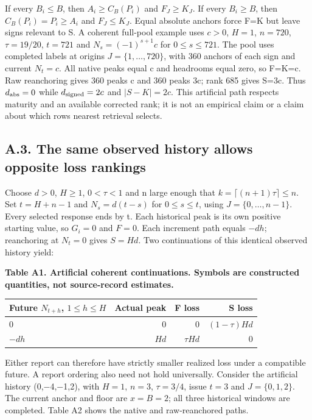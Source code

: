 \documentclass[10pt,a4paper]{article}
\begin{document}
If every \(B_i\le B\), then \(A_i\ge C_B(P_i)\) and \(F_J\ge K_J\). If every \(B_i\ge B\), then \(C_B(P_i)=P_i\ge A_i\) and \(F_J\le K_J\). Equal absolute anchors force F=K but leave signs relevant to S. A coherent full-pool example uses \(c>0\), \(H=1\), \(n=720\), \(\tau=19/20\), \(t=721\) and \(N_s=(-1)^{s+1}c\) for \(0\le s\le721\). The pool uses completed labels at origins \(J=\{1,\ldots,720\}\), with 360 anchors of each sign and current \(N_t=c\). All native peaks equal c and headrooms equal zero, so F=K=c. Raw reanchoring gives 360 peaks c and 360 peaks 3c; rank 685 gives S=3c. Thus \(d_{\rm abs}=0\) while \(d_{\rm signed}=2c\) and \(|S-K|=2c\). This artificial path respects maturity and an available corrected rank; it is not an empirical claim or a claim about which rows nearest retrieval selects.

\subsection*{A.3. The same observed history allows opposite loss rankings}
Choose \(d>0\), \(H\ge 1\), \(0<\tau<1\) and n large enough that \(k=\lceil(n+1)\tau\rceil\le n\). Set \(t=H+n-1\) and \(N_s=d(t-s)\) for \(0\le s\le t\), using \(J=\{0,\ldots,n-1\}\). Every selected response ends by t. Each historical peak is its own positive starting value, so \(G_i=0\) and \(F=0\). Each increment path equals \(-dh\); reanchoring at \(N_t=0\) gives \(S=Hd\). Two continuations of this identical observed history yield:

\begin{center}
\begin{minipage}{\linewidth}
\small\textbf{Table A1. Artificial coherent continuations. Symbols are constructed quantities, not source-record estimates.}\par\medskip
\centering\fontsize{8}{10}\selectfont
\begin{tabular}{lrrr}
\toprule
Future \(N_{t+h}\), \(1\le h\le H\) & Actual peak & F loss & S loss \\
\midrule
0 & 0 & 0 & \((1-\tau)Hd\) \\
\(-dh\) & \(Hd\) & \(\tau Hd\) & 0 \\
\bottomrule
\end{tabular}
\end{minipage}
\end{center}
Either report can therefore have strictly smaller realized loss under a compatible future. A report ordering also need not hold universally. Consider the artificial history (0,\(-\)4,\(-\)1,2), with \(H=1\), \(n=3\), \(\tau=3/4\), issue \(t=3\) and \(J=\{0,1,2\}\). The current anchor and floor are \(x=B=2\); all three historical windows are completed. Table A2 shows the native and raw-reanchored paths.
\end{document}
